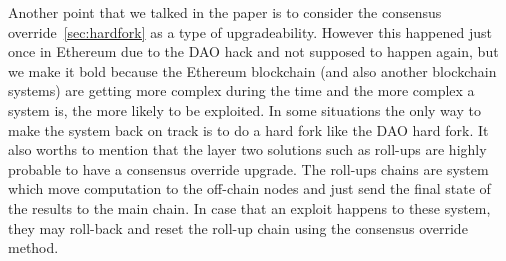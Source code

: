 Another point that we talked in the paper is to consider the consensus override~\ref{sec:hardfork} as a type of upgradeability. However this happened just once in Ethereum due to the DAO hack and not supposed to happen again, but we make it bold because the Ethereum blockchain (and also another blockchain systems) are getting more complex during the time and the more complex a system is, the more likely to be exploited. In some situations the only way to make the system back on track is to do a hard fork like the DAO hard fork. 
It also worths to mention that the layer two solutions such as roll-ups are highly probable to have a consensus override upgrade. The roll-ups chains are system which move computation to the off-chain nodes and just send the final state of the results to the main chain. In case that an exploit happens to these system, they may roll-back and reset the roll-up chain using the consensus override method.   


